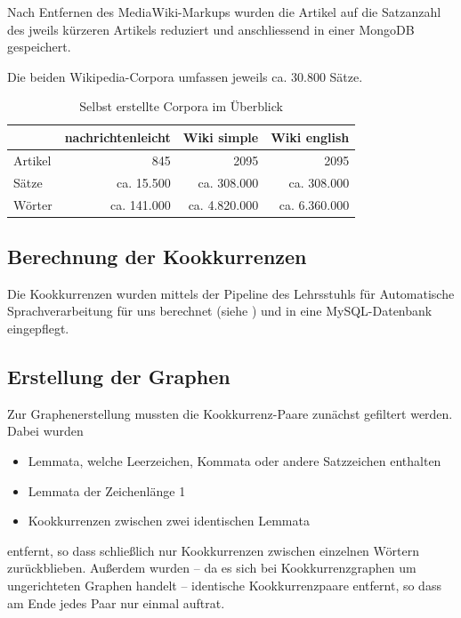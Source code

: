 \documentclass[11pt, a4paper]{article}
\begin{document}
Nach Entfernen des MediaWiki-Markups wurden die Artikel auf die Satzanzahl
des jweils k\"urzeren Artikels reduziert und anschliessend in einer MongoDB
gespeichert.

Die beiden Wikipedia-Corpora umfassen jeweils ca. 30.800 Sätze.

\begin{table}[ht]
  \centering
  \begin{tabular}{lrrr}
    \toprule
                &  nachrichtenleicht & Wiki simple   & Wiki english\\
    \midrule
    Artikel     & 845                & 2095          & 2095\\
    Sätze       & ca. 15.500         & ca. 308.000   & ca. 308.000\\
    Wörter      & ca. 141.000        & ca. 4.820.000 & ca. 6.360.000\\
    \bottomrule
  \end{tabular}
  \caption{\label{tab:corpora} Selbst erstellte Corpora im Überblick}
\end{table}


\subsection{Berechnung der Kookkurrenzen}

Die Kookkurrenzen wurden mittels der Pipeline des Lehrsstuhls f\"ur
Automatische Sprachverarbeitung für uns berechnet (siehe \cite{Quasthoff2006})
und in eine MySQL-Datenbank eingepflegt.


\subsection{Erstellung der Graphen}

Zur Graphenerstellung mussten die Kookkurrenz-Paare zunächst gefiltert werden.
Dabei wurden 
\begin{itemize}
    \item Lemmata, welche Leerzeichen, Kommata oder andere Satzzeichen enthalten
    \item Lemmata der Zeichenlänge 1
    \item Kookkurrenzen zwischen zwei identischen Lemmata
\end{itemize}
entfernt, so dass schließlich nur Kookkurrenzen zwischen einzelnen Wörtern
zurückblieben.
Außerdem wurden -- da es sich bei Kookkurrenzgraphen um ungerichteten Graphen
handelt -- identische
Kookkurrenzpaare entfernt, so dass am Ende jedes Paar nur einmal auftrat.
\end{document}
